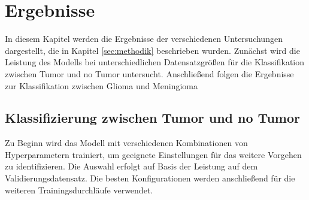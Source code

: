 \chapter{Ergebnisse}
In diesem Kapitel werden die Ergebnisse der verschiedenen Untersuchungen dargestellt, die in Kapitel \ref{sec:methodik} beschrieben wurden.
Zunächst wird die Leistung des Modells bei unterschiedlichen Datensatzgrößen für die Klassifikation zwischen Tumor und no Tumor untersucht.
Anschließend folgen die Ergebnisse zur Klassifikation zwischen Glioma und Meningioma

\section{Klassifizierung zwischen Tumor und no Tumor}
Zu Beginn wird das Modell mit verschiedenen Kombinationen von Hyperparametern trainiert, um geeignete Einstellungen für das weitere Vorgehen zu identifizieren.
Die Auswahl erfolgt auf Basis der Leistung auf dem Validierungsdatensatz.
Die besten Konfigurationen werden anschließend für die weiteren Trainingsdurchläufe verwendet.

